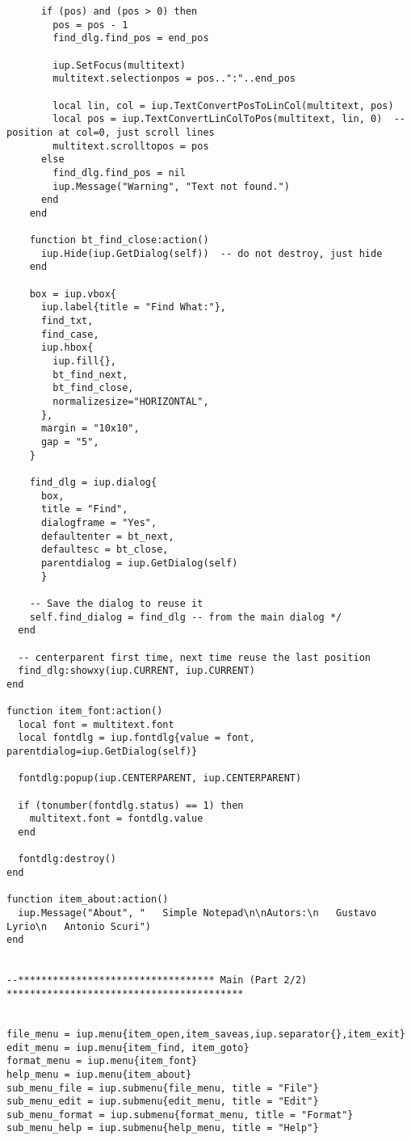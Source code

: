 \documentclass{ctexart}
\begin{document}
\begin{lstlisting}
      if (pos) and (pos > 0) then
        pos = pos - 1
        find_dlg.find_pos = end_pos

        iup.SetFocus(multitext)
        multitext.selectionpos = pos..":"..end_pos

        local lin, col = iup.TextConvertPosToLinCol(multitext, pos)
        local pos = iup.TextConvertLinColToPos(multitext, lin, 0)  -- position at col=0, just scroll lines
        multitext.scrolltopos = pos
      else
        find_dlg.find_pos = nil
        iup.Message("Warning", "Text not found.")
      end
    end

    function bt_find_close:action()
      iup.Hide(iup.GetDialog(self))  -- do not destroy, just hide
    end

    box = iup.vbox{
      iup.label{title = "Find What:"},
      find_txt,
      find_case,
      iup.hbox{
        iup.fill{},
        bt_find_next,
        bt_find_close,
        normalizesize="HORIZONTAL", 
      },
      margin = "10x10", 
      gap = "5",
    }

    find_dlg = iup.dialog{
      box, 
      title = "Find", 
      dialogframe = "Yes", 
      defaultenter = bt_next, 
      defaultesc = bt_close,
      parentdialog = iup.GetDialog(self)
      }

    -- Save the dialog to reuse it 
    self.find_dialog = find_dlg -- from the main dialog */
  end

  -- centerparent first time, next time reuse the last position
  find_dlg:showxy(iup.CURRENT, iup.CURRENT)
end

function item_font:action()
  local font = multitext.font
  local fontdlg = iup.fontdlg{value = font, parentdialog=iup.GetDialog(self)}

  fontdlg:popup(iup.CENTERPARENT, iup.CENTERPARENT)

  if (tonumber(fontdlg.status) == 1) then
    multitext.font = fontdlg.value
  end

  fontdlg:destroy()
end

function item_about:action()
  iup.Message("About", "   Simple Notepad\n\nAutors:\n   Gustavo Lyrio\n   Antonio Scuri")
end


--********************************** Main (Part 2/2) *****************************************


file_menu = iup.menu{item_open,item_saveas,iup.separator{},item_exit}
edit_menu = iup.menu{item_find, item_goto}
format_menu = iup.menu{item_font}
help_menu = iup.menu{item_about}
sub_menu_file = iup.submenu{file_menu, title = "File"}
sub_menu_edit = iup.submenu{edit_menu, title = "Edit"}
sub_menu_format = iup.submenu{format_menu, title = "Format"}
sub_menu_help = iup.submenu{help_menu, title = "Help"}


\end{lstlisting}
\end{document}
